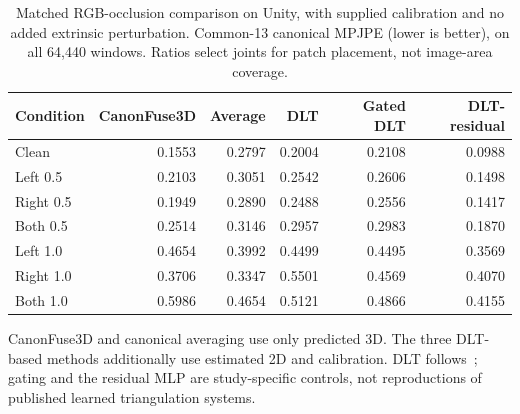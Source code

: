 \begin{table}[htbp]
\centering
\caption{Matched RGB-occlusion comparison on Unity, with supplied calibration and no added extrinsic perturbation. Common-13 canonical MPJPE (lower is better), on all 64,440 windows. Ratios select joints for patch placement, not image-area coverage.}
\label{tab:c07_occlusion_mpjpe}
\small
\setlength{\tabcolsep}{4pt}
\begin{tabular}{lrrrrr}
\toprule
Condition & CanonFuse3D & Average & DLT & Gated DLT & DLT-residual \\
\midrule
Clean & 0.1553 & 0.2797 & 0.2004 & 0.2108 & 0.0988 \\
Left 0.5 & 0.2103 & 0.3051 & 0.2542 & 0.2606 & 0.1498 \\
Right 0.5 & 0.1949 & 0.2890 & 0.2488 & 0.2556 & 0.1417 \\
Both 0.5 & 0.2514 & 0.3146 & 0.2957 & 0.2983 & 0.1870 \\
Left 1.0 & 0.4654 & 0.3992 & 0.4499 & 0.4495 & 0.3569 \\
Right 1.0 & 0.3706 & 0.3347 & 0.5501 & 0.4569 & 0.4070 \\
Both 1.0 & 0.5986 & 0.4654 & 0.5121 & 0.4866 & 0.4155 \\
\bottomrule
\end{tabular}
\par\smallskip\begin{minipage}{\linewidth}\footnotesize CanonFuse3D and canonical averaging use only predicted 3D. The three DLT-based methods additionally use estimated 2D and calibration. DLT follows~\cite{hartley2004multiple}; gating and the residual MLP are study-specific controls, not reproductions of published learned triangulation systems.\end{minipage}
\end{table}

